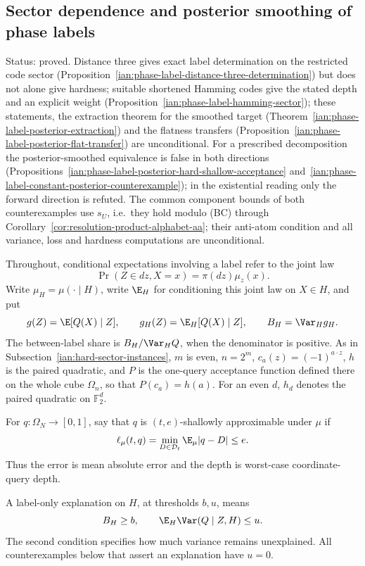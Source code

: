 \subsection{Sector dependence and posterior smoothing of phase labels}
\label{ian:phase-label-sectors}

Status: proved. Distance three gives exact label determination on the restricted code sector (Proposition~\ref{ian:phase-label-distance-three-determination}) but does not alone give hardness; suitable shortened Hamming codes give the stated depth and an explicit weight (Proposition~\ref{ian:phase-label-hamming-sector}); these statements, the extraction theorem for the smoothed target (Theorem~\ref{ian:phase-label-posterior-extraction}) and the flatness transfers (Proposition~\ref{ian:phase-label-posterior-flat-transfer}) are unconditional. For a prescribed decomposition the posterior-smoothed equivalence is false in both directions (Propositions~\ref{ian:phase-label-posterior-hard-shallow-acceptance} and~\ref{ian:phase-label-constant-posterior-counterexample}); in the existential reading only the forward direction is refuted. The common component bounds of both counterexamples use \(s_U\), i.e.\ they hold modulo (BC) through Corollary~\ref{cor:resolution-product-alphabet-aa}; their anti-atom condition and all variance, loss and hardness computations are unconditional.

Throughout, conditional expectations involving a label refer to the joint law
\[
 \Pr(Z\in dz,X=x)=\pi(dz)\mu_z(x).
\]
Write \(\mu_H=\mu(\cdot\mid H)\), write \(\E_H\) for conditioning this joint law on \(X\in H\), and put
\[
 g(Z)=\E[Q(X)\mid Z],\qquad
 g_H(Z)=\E_H[Q(X)\mid Z],\qquad
 B_H=\Var_H g_H.
\]
The between-label share is \(B_H/\Var_H Q\), when the denominator is positive. As in Subsection~\ref{ian:hard-sector-instances}, \(m\) is even, \(n=2^m\), \(c_a(z)=(-1)^{a\cdot z}\), \(h\) is the paired quadratic, and \(P\) is the one-query acceptance function defined there on the whole cube \(\Omega_n\), so that \(P(c_a)=h(a)\). For an even \(d\), \(h_d\) denotes the paired quadratic on \(\mathbb F_2^d\).

\begin{definition}
\label{ian:phase-label-sector-shallow-definition}
For \(q:\Omega_N\to[0,1]\), say that \(q\) is
\((t,e)\)-shallowly approximable under \(\mu\) if
\[
 \ell_\mu(t,q)=\min_{D\in\mathcal D_t}\E_\mu|q-D|\le e.
\]
Thus the error is mean absolute error and the depth is worst-case coordinate-query depth.

A label-only explanation on \(H\), at thresholds \(b,u\), means
\[
 B_H\ge b,\qquad
 \E_H\Var(Q\mid Z,H)\le u.
\]
The second condition specifies how much variance remains unexplained. All counterexamples below that assert an explanation have \(u=0\).
\end{definition}

